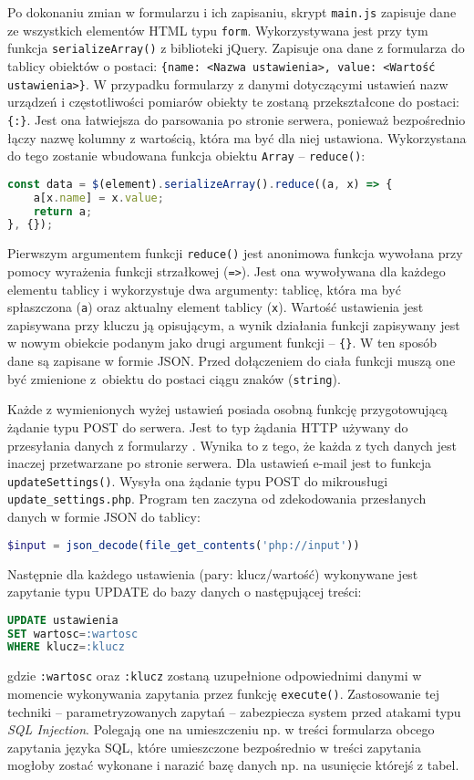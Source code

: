 \documentclass[a4paper,11pt,twoside]{article}
\begin{document}
Po dokonaniu zmian w formularzu i ich zapisaniu, skrypt \texttt{main.js} zapisuje dane ze wszystkich elementów HTML typu \texttt{form}. Wykorzystywana jest przy tym funkcja \linebreak \texttt{serializeArray()} z biblioteki jQuery. Zapisuje ona dane z formularza do tablicy obiektów o postaci: \texttt{\{name: <Nazwa ustawienia>, value: <Wartość ustawienia>\}}. W przypadku formularzy z danymi dotyczącymi ustawień nazw urządzeń i częstotliwości pomiarów obiekty te zostaną przekształcone do postaci: \texttt{\{<Nazwa ustawienia>:\}}. Jest ona łatwiejsza do parsowania po stronie serwera, ponieważ bezpośrednio łączy nazwę kolumny z wartością, która ma być dla niej ustawiona. Wykorzystana do tego zostanie wbudowana funkcja obiektu \texttt{Array} -- \texttt{reduce()}:
\begin{lstlisting}[language=JavaScript]
const data = $(element).serializeArray().reduce((a, x) => {
	a[x.name] = x.value;
	return a;
}, {});
\end{lstlisting}
Pierwszym argumentem funkcji \texttt{reduce()} jest anonimowa funkcja wywołana przy pomocy wyrażenia funkcji strzałkowej (\texttt{=>}). Jest ona wywoływana dla każdego elementu tablicy i wykorzystuje dwa argumenty: tablicę, która ma być spłaszczona (\texttt{a}) oraz aktualny element tablicy (\texttt{x}). Wartość ustawienia jest zapisywana przy kluczu ją opisującym, a wynik działania funkcji zapisywany jest w nowym obiekcie podanym jako drugi argument funkcji -- \texttt{\{\}}. W ten sposób dane są zapisane w formie JSON. Przed dołączeniem do ciała funkcji muszą one być zmienione z~obiektu do postaci ciągu znaków (\texttt{string}).

Każde z wymienionych wyżej ustawień posiada osobną funkcję przygotowującą żądanie typu POST do serwera. Jest to typ żądania HTTP używany do przesyłania danych z formularzy \cite{http}. Wynika to z tego, że każda z tych danych jest inaczej przetwarzane po stronie serwera. Dla ustawień e-mail jest to funkcja \texttt{updateSettings()}. Wysyła ona żądanie typu POST do mikrousługi \texttt{update{\_}settings.php}. Program ten zaczyna od zdekodowania przesłanych danych w formie JSON do tablicy:
\begin{lstlisting}[language=PHP]
$input = json_decode(file_get_contents('php://input'))
\end{lstlisting}
Następnie dla każdego ustawienia (pary: klucz/wartość) wykonywane jest zapytanie typu UPDATE do bazy danych o następującej treści:
\begin{lstlisting}[language=SQL]
UPDATE ustawienia 
SET wartosc=:wartosc
WHERE klucz=:klucz
\end{lstlisting}
gdzie \texttt{:wartosc} oraz \texttt{:klucz} zostaną uzupełnione odpowiednimi danymi w momencie wykonywania zapytania przez funkcję \texttt{execute()}. Zastosowanie tej techniki -- parametryzowanych zapytań -- zabezpiecza system przed atakami typu \textit{SQL Injection}. Polegają one na umieszczeniu np. w treści formularza obcego zapytania języka SQL, które umieszczone bezpośrednio w treści zapytania mogłoby zostać wykonane i narazić bazę danych np. na usunięcie którejś z tabel.\cite{sql-injection}
\end{document}
